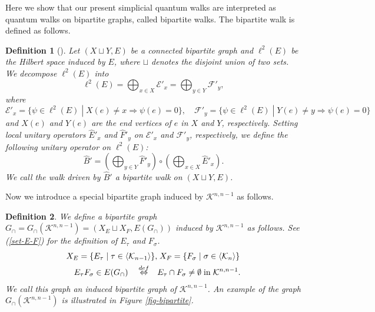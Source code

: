 \documentclass[a4paper,12pt]{article}
\newtheorem{definition}{Definition}[section]
\newcommand{\bra}{\langle}
\newcommand{\ket}{\rangle}
\numberwithin{equation}{section}
\begin{document}
Here we show that our present simplicial quantum walks are interpreted as quantum walks on bipartite graphs, called bipartite walks. 
The bipartite walk is defined as follows. 
\begin{definition}[\cite{Sze}]\rm
Let $(X\sqcup Y,E)$ be a connected bipartite graph and $\ell^2(E)$ be the Hilbert space induced by $E$, where $\sqcup$ denotes the disjoint union of two sets. 
We decompose $\ell^2(E)$ into 
\begin{equation*}
\ell^2(E)=\bigoplus_{x\in X} {\mathcal{E}}'_x=\bigoplus_{y\in Y} {\mathcal{F}}'_y,
\end{equation*}
where 
\begin{equation*}
{\mathcal{E}}'_x=\{\psi\in \ell^2(E) \;|\; X(e)\neq x \Rightarrow \psi(e)=0\},\quad {\mathcal{F}}'_y=\{\psi\in \ell^2(E) \;|\; Y(e)\neq y \Rightarrow \psi(e)=0\}
\end{equation*}
and $X(e)$ and $Y(e)$ are the end vertices of $e$ in $X$ and $Y$, respectively. 
Setting local unitary operators ${\hat{E}}'_x$ and ${\hat{F}}'_y$ on ${\mathcal{E}}'_x$ and ${\mathcal{F}}'_y$, respectively,
we define the following unitary operator on $\ell^2(E)$:
\begin{equation*}
\hat{B}'= \left(\bigoplus_{y\in Y} {\hat{F}}'_y \right) \circ \left(\bigoplus_{x\in X} {\hat{E}}'_x \right).
\end{equation*}
We call the walk driven by $\hat B'$ a {\em bipartite walk} on $(X\sqcup Y, E)$. 
\end{definition}
Now we introduce a special bipartite graph induced by $\mathcal{K}^{n,n-1}$ as follows. 
\begin{definition}\rm
We define a bipartite graph $G_\cap = G_\cap (\mathcal{K}^{n,n-1})=(X_E\sqcup X_F, E(G_\cap))$ induced by $\mathcal{K}^{n,n-1}$ as follows. 
See (\ref{set-E-F}) for the definition of $E_\tau$ and $F_\sigma$.
\begin{align}
\notag
	X_E = \{E_\tau \;|\; \tau\in \bra \mathcal{K}_{n-1} \ket\},&\;X_F = \{F_\sigma \;|\; \sigma\in \bra \mathcal{K}_{n} \ket\} \\
\label{edge-def}
        E_\tau F_\sigma\in E(G_\cap) \quad \stackrel{def}{\Leftrightarrow} \quad & E_\tau\cap F_\sigma \neq \emptyset \;\mathrm{in}\; \mathcal{K}^{n,n-1}. 
\end{align}
We call this graph an {\em induced bipartite graph of $\mathcal{K}^{n,n-1}$}. 
An example of the graph $G_\cap (\mathcal{K}^{n,n-1})$ is illustrated in Figure \ref{fig-bipartite}.
\end{definition}
\end{document}
